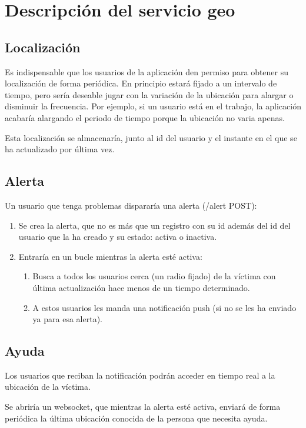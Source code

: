 \chapter{Descripción del servicio geo}

\section{Localización}
Es indispensable que los usuarios de la aplicación den permiso para obtener su localización de forma periódica. En principio estará fijado a un intervalo de tiempo, pero sería deseable 
jugar con la variación de la ubicación para alargar o disminuir la frecuencia. Por ejemplo, si un usuario está en el trabajo, la aplicación acabaría alargando el periodo de tiempo porque la ubicación no varia apenas. 

Esta localización se almacenaría, junto al id del usuario y el instante en el que se ha actualizado por última vez.

\section{Alerta}

Un usuario que tenga problemas dispararía una alerta (/alert POST):

\begin{enumerate}
  \item Se crea la alerta, que no es más que un registro con su id además del id del usuario que la ha creado y su estado: activa o inactiva.
  \item Entraría en un bucle mientras la alerta esté activa:
  \begin{enumerate}
    \item Busca a todos los usuarios cerca (un radio fijado) de la víctima con última actualización hace menos de un tiempo determinado.
    \item A estos usuarios les manda una notificación push (si no se les ha enviado ya para esa alerta).
  \end{enumerate}
\end{enumerate}


\section{Ayuda}

Los usuarios que reciban la notificación podrán acceder en tiempo real a la ubicación de la víctima.

Se abriría un websocket, que mientras la alerta esté activa, enviará de forma periódica la última ubicación conocida de la persona que necesita ayuda.
